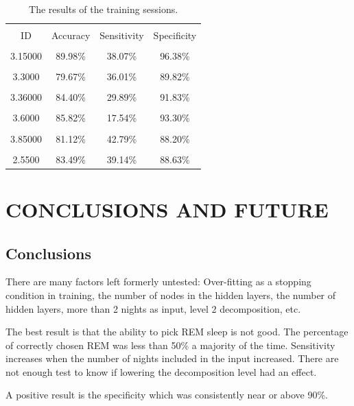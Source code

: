\documentclass[12pt, oneside]{book}
\begin{document}
\begin{table}[H]
	{\hspace{0cm}
		\begin{tabular}{|c|c|c|c|}
			\hline \\ [-1.5ex]
			ID      & Accuracy & Sensitivity & Specificity \\
			\hline \\ [-1.5ex]
			3.15000 & 89.98\%  & 38.07\%     & 96.38\%     \\
			\hline \\ [-1.5ex]
			3.3000  & 79.67\%  & 36.01\%     & 89.82\%     \\
			\hline \\ [-1.5ex]
			3.36000 & 84.40\%  & 29.89\%     & 91.83\%     \\
			\hline \\ [-1.5ex]
			3.6000  & 85.82\%  & 17.54\%     & 93.30\%     \\
			\hline \\ [-1.5ex]
			3.85000 & 81.12\%  & 42.79\%     & 88.20\%     \\
			\hline \\ [-1.5ex]
			2.5500  & 83.49\%  & 39.14\%     & 88.63\%  \\   
			\hline
		\end{tabular}
	} 
	\caption{The results of the training sessions.}
	\label{tab:pred}
\end{table}


\chapter{\textbf{CONCLUSIONS AND FUTURE}}

\section{\textbf{Conclusions}}

There are many factors left formerly untested: Over-fitting as a stopping condition in training, the number of nodes in the hidden layers, the number of hidden layers,  more than 2 nights as input, level 2 decomposition, etc. 

The best result is that the ability to pick REM sleep is not good. The percentage of correctly chosen REM was less than 50\% a majority of the time. Sensitivity increases when the number of nights included in the input increased. There are not enough test to know if lowering the decomposition level had an effect. 

A positive result is the specificity which was consistently near or above 90\%. 
\end{document}
